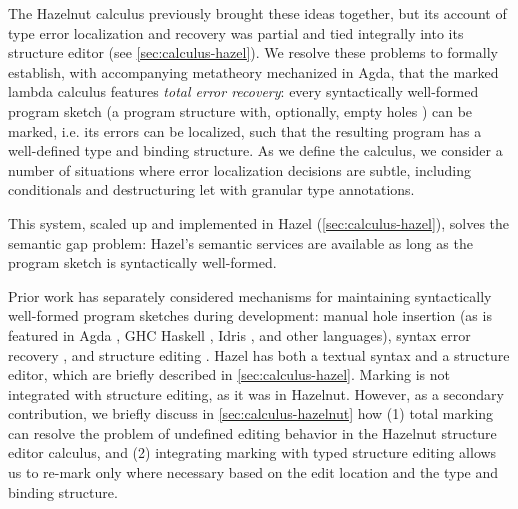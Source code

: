 The Hazelnut calculus \cite{HazelnutPOPL} previously brought these ideas together, but its account of type error localization and recovery was partial and tied integrally into its structure editor (see \cref{sec:calculus-hazel}). 
We resolve these problems to formally establish, with accompanying metatheory mechanized in Agda, that the marked lambda calculus features \emph{total error recovery}: {every} syntactically well-formed program sketch (a program structure with, optionally, empty holes \cite{solar2013program}) can be marked, i.e. its errors can be localized, such that the resulting program has a well-defined type and binding structure.
As we define the calculus, we consider a number of situations where error localization decisions are subtle, including conditionals and destructuring let with granular type annotations.

This system, scaled up and implemented in Hazel (\cref{sec:calculus-hazel}), solves the semantic gap problem: Hazel's semantic services are available as long as the program sketch is syntactically well-formed.
% 

Prior work has separately considered mechanisms for maintaining syntactically well-formed program sketches during development: manual hole insertion (as is featured in Agda \cite{norell:thesis}, GHC Haskell \cite{haskell-holes}, Idris \cite{DBLP:journals/jfp/Brady13}, and other languages), syntax error recovery \cite{medeiros20,sorkin11}, and structure editing \cite{HazelnutPOPL}. 
Hazel has both a textual syntax and a structure editor, which are briefly described in \cref{sec:calculus-hazel}.
Marking is not integrated with structure editing, as it was in Hazelnut. 
However, as a secondary contribution, 
we briefly discuss in \cref{sec:calculus-hazelnut} how (1)  total marking can resolve the problem of undefined editing behavior in the Hazelnut structure editor calculus, 
and (2) integrating marking with typed structure editing allows us to re-mark only where necessary based on the edit location and the type and binding structure.

